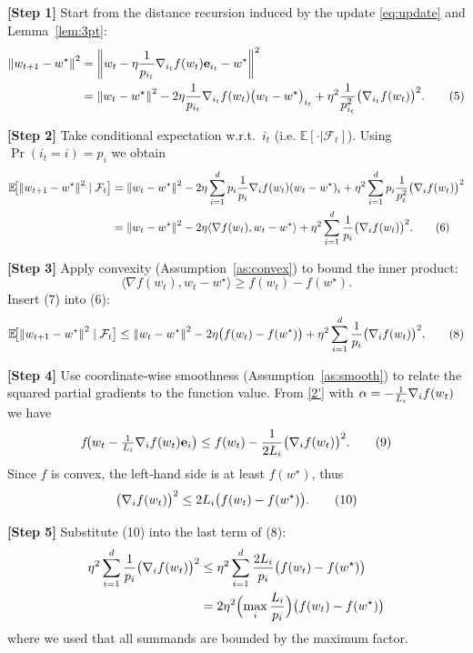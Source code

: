 \documentclass{article}
\newcommand{\E}{\mathbb{E}}
\newcommand{\norm}[1]{\left\lVert#1\right\rVert}
\newcommand{\ip}[2]{\langle #1,#2\rangle}
\newcommand{\grad}[1]{\nabla #1}
\newcommand{\e}{\mathbf{e}}
\begin{document}
\bigskip
\noindent\textbf{[Step 1]}  Start from the distance recursion induced by the update \eqref{eq:update} and Lemma~\ref{lem:3pt}:
\begin{align}
\norm{w_{t+1}-w^{\star}}^{2}
&=\norm{w_t-\eta\frac{1}{p_{i_t}}\grad_{i_t}f(w_t)\e_{i_t}-w^{\star}}^{2}\nonumber\\
&=\norm{w_t-w^{\star}}^{2}
-2\eta\frac{1}{p_{i_t}}\grad_{i_t}f(w_t)\bigl(w_t-w^{\star}\bigr)_{i_t}
+\eta^{2}\frac{1}{p_{i_t}^{2}}\bigl(\grad_{i_t}f(w_t)\bigr)^{2}.
\tag{5}
\end{align}

\noindent\textbf{[Step 2]}  Take conditional expectation w.r.t.\ $i_t$ (i.e. $\E[\cdot|\mathcal{F}_t]$).  Using $\Pr(i_t=i)=p_i$ we obtain
\begin{align}
\E\!\bigl[\norm{w_{t+1}-w^{\star}}^{2}\mid\mathcal{F}_t\bigr]
&=\norm{w_t-w^{\star}}^{2}
-2\eta\sum_{i=1}^{d}p_i\frac{1}{p_i}\grad_i f(w_t)(w_t-w^{\star})_i
+\eta^{2}\sum_{i=1}^{d}p_i\frac{1}{p_i^{2}}\bigl(\grad_i f(w_t)\bigr)^{2}\nonumber\\
&=\norm{w_t-w^{\star}}^{2}
-2\eta\ip{\grad f(w_t)}{w_t-w^{\star}}
+\eta^{2}\sum_{i=1}^{d}\frac{1}{p_i}\bigl(\grad_i f(w_t)\bigr)^{2}.
\tag{6}
\end{align}

\noindent\textbf{[Step 3]}  Apply convexity (Assumption~\ref{as:convex}) to bound the inner product:
\[
\ip{\grad f(w_t)}{w_t-w^{\star}}\ge f(w_t)-f(w^{\star}).
\tag{7}
\]
Insert (7) into (6):
\begin{align}
\E\!\bigl[\norm{w_{t+1}-w^{\star}}^{2}\mid\mathcal{F}_t\bigr]
\le
\norm{w_t-w^{\star}}^{2}
-2\eta\bigl(f(w_t)-f(w^{\star})\bigr)
+\eta^{2}\sum_{i=1}^{d}\frac{1}{p_i}\bigl(\grad_i f(w_t)\bigr)^{2}.
\tag{8}
\end{align}

\noindent\textbf{[Step 4]}  Use coordinate‑wise smoothness (Assumption~\ref{as:smooth}) to relate the squared partial gradients to the function value.  From \eqref{2'} with $\alpha = -\frac{1}{L_i}\grad_i f(w_t)$ we have
\[
f\!\bigl(w_t-\tfrac{1}{L_i}\grad_i f(w_t)\e_i\bigr)
\le
f(w_t)-\frac{1}{2L_i}\bigl(\grad_i f(w_t)\bigr)^{2}.
\tag{9}
\]
Since $f$ is convex, the left‑hand side is at least $f(w^{\star})$, thus
\[
\bigl(\grad_i f(w_t)\bigr)^{2}\le 2L_i\bigl(f(w_t)-f(w^{\star})\bigr).
\tag{10}
\]

\noindent\textbf{[Step 5]}  Substitute (10) into the last term of (8):
\begin{align}
\eta^{2}\sum_{i=1}^{d}\frac{1}{p_i}\bigl(\grad_i f(w_t)\bigr)^{2}
&\le
\eta^{2}\sum_{i=1}^{d}\frac{2L_i}{p_i}\bigl(f(w_t)-f(w^{\star})\bigr)\nonumber\\
&=2\eta^{2}\Bigl(\max_{i}\frac{L_i}{p_i}\Bigr)\bigl(f(w_t)-f(w^{\star})\bigr)
\label{eq:bound_smooth}
\end{align}
where we used that all summands are bounded by the maximum factor.
\end{document}
